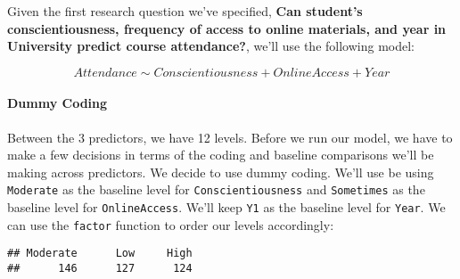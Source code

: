 \documentclass[
]{article}
\newenvironment{Shaded}{\begin{snugshade}}{\end{snugshade}}
\newcommand{\AttributeTok}[1]{\textcolor[rgb]{0.13,0.29,0.53}{#1}}
\newcommand{\FunctionTok}[1]{\textcolor[rgb]{0.13,0.29,0.53}{\textbf{#1}}}
\newcommand{\NormalTok}[1]{#1}
\newcommand{\OtherTok}[1]{\textcolor[rgb]{0.56,0.35,0.01}{#1}}
\newcommand{\SpecialCharTok}[1]{\textcolor[rgb]{0.81,0.36,0.00}{\textbf{#1}}}
\newcommand{\StringTok}[1]{\textcolor[rgb]{0.31,0.60,0.02}{#1}}
\begin{document}
Given the first research question we've specified, \textbf{Can student's conscientiousness, frequency of access to online materials, and year in University predict course attendance?}, we'll use the following model:

\[Attendance \sim Conscientiousness + OnlineAccess + Year\]

\hypertarget{dummy-coding}{%
\paragraph{Dummy Coding}\label{dummy-coding}}

Between the 3 predictors, we have 12 levels. Before we run our model, we have to make a few decisions in terms of the coding and baseline comparisons we'll be making across predictors. We decide to use dummy coding. We'll use be using \texttt{Moderate} as the baseline level for \texttt{Conscientiousness} and \texttt{Sometimes} as the baseline level for \texttt{OnlineAccess}. We'll keep \texttt{Y1} as the baseline level for \texttt{Year}. We can use the \texttt{factor} function to order our levels accordingly:

\begin{Shaded}
\end{Shaded}

\begin{verbatim}
## Moderate      Low     High 
##      146      127      124
\end{verbatim}

\begin{Shaded}
\end{Shaded}
\end{document}
